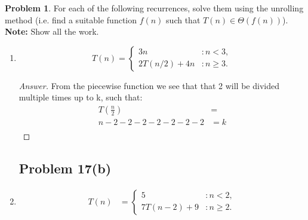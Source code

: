 \documentclass[11pt]{article}
\theoremstyle{definition}
\theoremstyle{definition}
\newtheorem{required}{Problem}
\theoremstyle{definition}
\begin{document}
\begin{required} \label{unrolling}
For each of the following recurrences, solve them using the unrolling method (i.e. find a suitable function $f(n)$ such that $T(n) \in \Theta(f(n))$). \textbf{Note: } Show all the work.

\renewcommand{\theenumi}{\alph{enumi}}
\begin{enumerate}
\subsection{Problem 17(a)}
\item 
$$
T(n) = \begin{cases}
3n & : n < 3, \\
2T(n / 2) + 4n & : n \geq 3.
\end{cases}
$$

\begin{proof}[Answer]
From the piecewise function we see that that 2 will be divided multiple times up to k, such that: \\
\begin{align*}
T(\frac{n}{2}) &= \\
n - 2 - 2 - 2 - 2 - 2 - 2 - 2 &= k \\
\end{align*}
\end{proof}


\newpage
\subsection{Problem 17(b)}
\item 
\begin{align*}
T(n) &= \begin{cases} 
5 & : n < 2, \\
7T(n-2) + 9 & : n \geq 2.
\end{cases}
\end{align*}


\end{enumerate}
\end{required}
\end{document}

